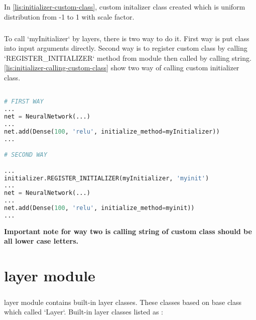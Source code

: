 \documentclass[12pt]{report}
\begin{document}
In \ref{lis:initializer-custom-class}, custom initalizer class created which is uniform distribution from -1 to 1 with scale factor. 

\paragraph{}
To call `myInitializer` by layers, there is two way to do it. First way is put class into input arguments directly. Second way is to register custom class by calling `REGISTER\_INITIALIZER` method from module then called by calling string. \ref{lis:initializer-calling-custom-class} show two way of calling custom initializer class.

\begin{lstlisting}[language=Python, numbers=none, caption={Calling custom initializer class.}, label={lis:initializer-calling-custom-class}]

# FIRST WAY
...
net = NeuralNetwork(...)
...
net.add(Dense(100, 'relu', initialize_method=myInitializer))
...

# SECOND WAY

...
initializer.REGISTER_INITIALIZER(myInitializer, 'myinit') 
...
net = NeuralNetwork(...)
...
net.add(Dense(100, 'relu', initialize_method=myinit))
...

\end{lstlisting}

\textbf{Important note for way two is calling string of custom class should be all lower case letters. }





\chapter{layer module}
\label{ch:layer}

\paragraph{}
layer module contains built-in layer classes. These classes based on base class which called `Layer`. Built-in layer classes listed as : 
\end{document}
